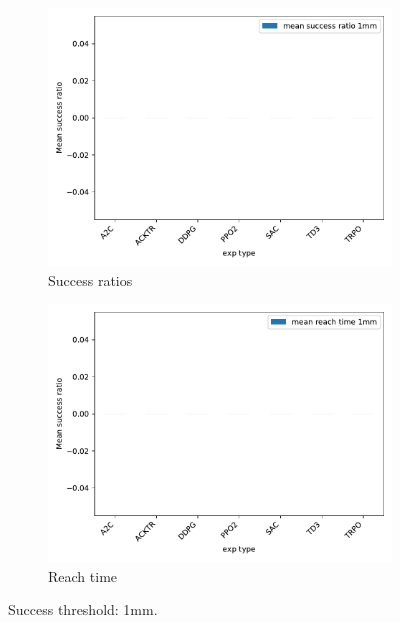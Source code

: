 \documentclass{article}
\begin{document}
\begin{figure}[H]
\centering
\begin{subfigure}{0.49\textwidth}
  \centering
  \includegraphics[width=\textwidth]{../success_1mm.pdf}
  \caption{Success ratios} 
\end{subfigure}
\begin{subfigure}{0.49\textwidth}
  \centering
  \includegraphics[width=\textwidth]{../reachtime_1mm.pdf} 
  \caption{Reach time}
\end{subfigure}
\caption{Success threshold: 1mm.}
\end{figure}
\end{document}
